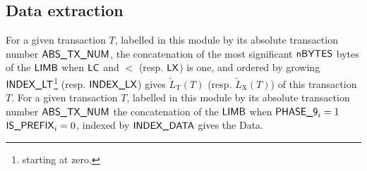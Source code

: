 \subsection{Data extraction}
For a given transaction $T$, labelled in this module by its absolute transaction number
$\textsf{ABS\_TX\_NUM}$, the concatenation of the most significant 
$\textsf{nBYTES}$ bytes of the 
$\textsf{LIMB}$ when
$\textsf{LC}$ and
$\lt$ (resp.
$\textsf{LX}$) is one, and ordered by growing 
$\textsf{INDEX\_LT}$\footnote{starting at zero.} (resp. $\textsf{INDEX\_LX}$) gives $\widetilde{L}_{\mathrm{T}}(T)$ (resp. $\widetilde{L}_{\mathrm{X}}(T)$) of this transaction $T$.
\newline
For a given transaction $T$, labelled in this module by its absolute transaction number $\textsf{ABS\_TX\_NUM}$
the concatenation of the
$\textsf{LIMB}$ when
$\textsf{PHASE\_9}_{i}=1$ \et{}
$\textsf{IS\_PREFIX}_{i}=0$, indexed by
$\textsf{INDEX\_DATA}$ gives the Data.
